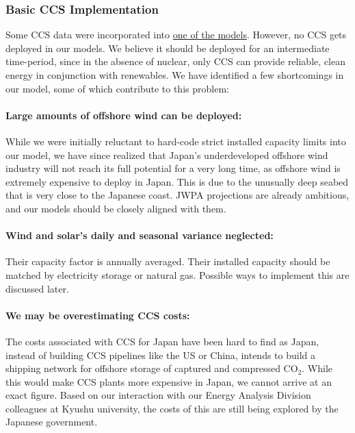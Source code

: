 \documentclass[14pt,a4paper]{article} %
\begin{document}
\subsubsection{Basic \gls{CCS} Implementation}
Some \gls{CCS} data \cite{kato_energy_2016}  were incorporated into \href{https://github.com/arfc/i2cner/tree/master/JPN-Main-Model/active/i2cner-nonuc}{one of the models}. However, no \gls{CCS} gets deployed in our models. We believe  it should be deployed for an intermediate time-period, since in the absence of nuclear, only \gls{CCS} can provide reliable, clean energy in conjunction with renewables. We have identified a few shortcomings in our model, some of which contribute to this problem:

\paragraph{Large amounts of offshore wind can be deployed:} While we were initially reluctant to hard-code strict installed  capacity limits into our model, we have since realized that Japan's underdeveloped offshore wind industry will not reach its full potential for a very long time, as offshore wind is extremely expensive to deploy in Japan. This is due to the unusually deep seabed that is very close to the Japanese coast. \gls{JWPA} projections \cite{heger_wind_2016} are already ambitious, and our models should be closely aligned with them.

\paragraph{Wind and solar's daily and seasonal variance neglected:} Their capacity factor is annually averaged. Their installed capacity should be matched by electricity storage or natural gas. Possible ways to implement this are discussed later.

\paragraph{We may be overestimating \gls{CCS} costs:} The costs associated with \gls{CCS} for Japan have been hard to find as Japan, instead of building \gls{CCS} pipelines like the US or China, intends to build a shipping network for offshore storage of captured and compressed CO$_2$. While this would make \gls{CCS} plants more expensive in Japan, we cannot arrive at an exact figure. Based on our interaction with our Energy Analysis Division colleagues at Kyushu university, the costs of this are still being explored by the Japanese government.
\end{document}
